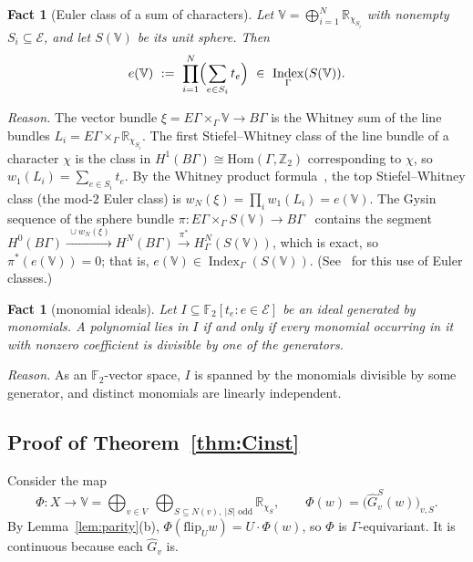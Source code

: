 \documentclass[11pt,letterpaper]{article}
\newtheorem{fact}[theorem]{Fact}
\theoremstyle{definition}
\newcommand{\R}{\mathbb{R}}
\newcommand{\Z}{\mathbb{Z}}
\newcommand{\FF}{\mathbb{F}}
\newcommand{\cE}{\mathcal{E}}
\DeclareMathOperator{\Index}{Index}
\newcommand{\flip}{\mathrm{flip}}
\newcommand{\hG}{\widehat{G}}
\begin{document}
\begin{fact}[Euler class of a sum of characters]\label{fact:euler}
Let $\mathbb V=\bigoplus_{i=1}^N\R_{\chi_{S_i}}$ with nonempty $S_i\subseteq\cE$, and let $S(\mathbb V)$ be
its unit sphere. Then
\[
  e(\mathbb V)\ :=\ \prod_{i=1}^N\Bigl(\sum_{e\in S_i}t_e\Bigr)\ \in\ \Index_\Gamma(S(\mathbb V)).
\]
\end{fact}

\noindent\emph{Reason.} The vector bundle $\xi=E\Gamma\times_\Gamma \mathbb V\to B\Gamma$ is the Whitney sum
of the line bundles $L_i=E\Gamma\times_\Gamma\R_{\chi_{S_i}}$. The first Stiefel--Whitney class of
the line bundle of a character $\chi$ is the class in $H^1(B\Gamma)\cong\mathrm{Hom}(\Gamma,\Z_2)$
corresponding to $\chi$, so $w_1(L_i)=\sum_{e\in S_i}t_e$. By the Whitney product
formula~\cite{MiSt74}, the top Stiefel--Whitney class (the mod-$2$ Euler class) is
$w_N(\xi)=\prod_iw_1(L_i)=e(\mathbb V)$. The Gysin sequence of the sphere bundle
$\pi\colon E\Gamma\times_\Gamma S(\mathbb V)\to B\Gamma$~\cite{MiSt74} contains the segment
$H^0(B\Gamma)\xrightarrow{\ \cup w_N(\xi)\ }H^N(B\Gamma)\xrightarrow{\ \pi^*\ }H^N_\Gamma(S(\mathbb V))$, which
is exact, so $\pi^*(e(\mathbb V))=0$; that is, $e(\mathbb V)\in\Index_\Gamma(S(\mathbb V))$. (See~\cite{FH88,BZ17} for this
use of Euler classes.)

\begin{fact}[monomial ideals]\label{fact:monomial}
Let $I\subseteq\FF_2[t_e:e\in\cE]$ be an ideal generated by monomials. A polynomial lies in $I$ if
and only if every monomial occurring in it with nonzero coefficient is divisible by one of the
generators.
\end{fact}

\noindent\emph{Reason.} As an $\FF_2$-vector space, $I$ is spanned by the monomials divisible by
some generator, and distinct monomials are linearly independent.

\subsection{Proof of Theorem~\ref{thm:Cinst}}

Consider the map
\[
  \Phi\colon X\to \mathbb V=\bigoplus_{v\in V}\ \bigoplus_{S\subseteq N(v),\ |S|\text{ odd}}\R_{\chi_S},\qquad
  \Phi(w)=\bigl(\hG_v^S(w)\bigr)_{v,S}.
\]
By Lemma~\ref{lem:parity}(b), $\Phi(\flip_Uw)=U\cdot\Phi(w)$, so $\Phi$ is $\Gamma$-equivariant. It
is continuous because each $\hG_v$ is.
\end{document}
